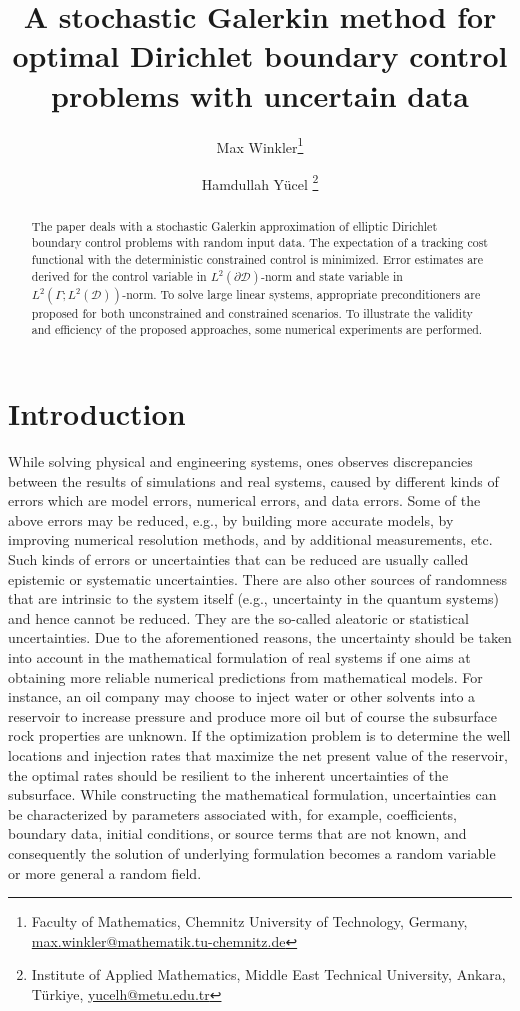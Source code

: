 \documentclass[a4paper,10pt]{article}
\author{Max Winkler\footnote{Faculty of Mathematics, Chemnitz University of Technology, Germany, \url{max.winkler@mathematik.tu-chemnitz.de}} \and Hamdullah Yücel \footnote{Institute of Applied Mathematics, Middle East Technical University, Ankara, Türkiye, \url{yucelh@metu.edu.tr}}}
\title{A stochastic Galerkin method for optimal Dirichlet boundary control problems with uncertain data}
\newcommand{\cD}{{\mathcal{D}}}
\newcommand{\yL}{{L^2(\Gamma;L^2(\cD))}}
\numberwithin{theorem}{section}
\begin{document}
\maketitle

\begin{abstract}
The paper deals with a stochastic Galerkin approximation of elliptic Dirichlet boundary control problems with random input data. The expectation of a tracking cost functional with the deterministic constrained control is minimized. Error estimates are derived for the control variable in $L^2(\partial \cD)$-norm and state variable in $\yL$-norm. To solve large linear systems, appropriate preconditioners are proposed for both unconstrained and constrained scenarios. To illustrate the validity and efficiency of the proposed approaches, some numerical experiments are performed.
\end{abstract}


\section{Introduction}\label{sec:intro}

While solving physical and engineering systems, ones  observes discrepancies between the results of simulations and real systems, caused by different kinds of errors which are model errors, numerical errors, and data errors. Some of the above errors may be reduced, e.g., by building more accurate models, by improving numerical resolution methods, and by additional measurements, etc.  Such kinds of  errors or uncertainties that can be reduced are usually called epistemic or systematic uncertainties. There are also other sources of randomness that are intrinsic to the system itself (e.g., uncertainty in the quantum systems) and hence cannot be reduced. They are the so-called aleatoric or statistical uncertainties. Due to the aforementioned reasons, the uncertainty should be taken into account in the mathematical formulation of real systems if one aims at obtaining more reliable numerical predictions from mathematical models. For instance, an oil company may choose to inject water or other solvents into a reservoir to increase pressure and produce more oil but of course the subsurface rock properties are unknown. If the optimization problem is to determine the well locations and injection rates that maximize the net present value of the reservoir, the optimal rates  should be resilient to the inherent uncertainties of the subsurface. While constructing the mathematical formulation, uncertainties can be characterized by parameters associated with, for example, coefficients, boundary data, initial conditions, or source terms that are not known, and  consequently the solution of underlying formulation becomes a random variable or more general a random field. 
\end{document}
